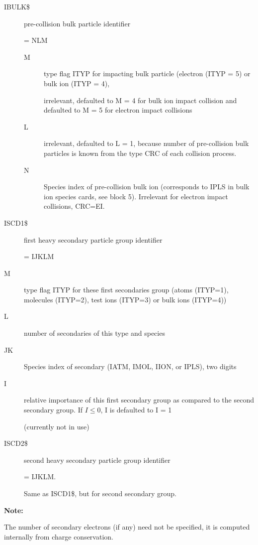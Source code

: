 \begin{description}
  \item[IBULK\$] pre-collision bulk particle identifier 

        = NLM
        \begin{description}
          \item[M] type flag ITYP for impacting bulk particle
                (electron (ITYP = 5) or bulk ion (ITYP = 4), 

                irrelevant, defaulted to M = 4 for bulk ion impact collision and defaulted to M
                = 5 for electron impact collisions
          \item[L] irrelevant, defaulted to L = 1,
                because number of pre-collision bulk particles is known from the type CRC of
                each collision process.
          \item[N] Species index of pre-collision bulk ion (corresponds to IPLS in bulk
                ion species cards, see block 5).
                Irrelevant for electron impact collisions, CRC=EI.
        \end{description}
  \item[ISCD1\$] first heavy secondary particle group identifier

        = IJKLM
  \item[M] type flag ITYP for these first secondaries group (atoms
        (ITYP=1), molecules (ITYP=2), test ions (ITYP=3) or bulk ions (ITYP=4))
  \item[L] number of secondaries of this type and species
  \item[JK] Species index
        of secondary (IATM, IMOL, IION, or IPLS), two digits
  \item[I] relative
        importance of this first secondary group as compared to the second secondary
        group.
        If $I \le 0$, I is defaulted to I = 1 

        (currently not in use)
  \item[ISCD2\$] second heavy secondary particle group
        identifier 

        = IJKLM.

        Same as ISCD1\$, but for second secondary group.
\end{description}

\bigskip

\textbf{Note:} 

The number of secondary electrons (if any) need not be specified, it is
computed internally from charge conservation.

